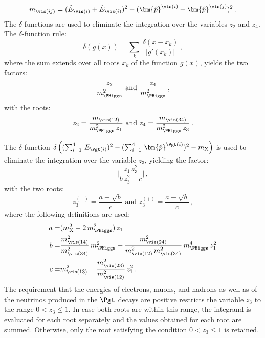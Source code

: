 \begin{equation*}
m_{\vis(ij)} = (\hat{E}_{\vis(i)} + \hat{E}_{\vis(i)})^{2} - (\bm{\hat{p}}^{\vis(i)} + \bm{\hat{p}}^{\vis(j)})^{2} \, .
\end{equation*}
The $\delta$-functions are used to eliminate the integration over the variables $z_{2}$ and $z_{4}$.
The $\delta$-function rule:
\begin{equation*} 
\delta \left( g(x) \right) = \sum_{k} \, \frac{\delta \left( x - x_{k}
  \right)}{\vert g'(x_{k}) \vert} \, ,
\end{equation*}
where the sum extends over all roots $x_{k}$ of the function $g(x)$,
yields the two factors:
\begin{equation*}
\frac{z_{2}}{m_{\PHiggs}^{2}} \mbox{ and } \frac{z_{4}}{m_{\PHiggs}^{2}} \, ,
\end{equation*}
with the roots:
\begin{equation*}
z_{2} = \frac{m_{\vis(12)}}{m_{\PHiggs}^{2} \, z_{1}} \mbox{ and } z_{4} = \frac{m_{\vis(34)}}{m_{\PHiggs}^{2} \, z_{3}} \, .
\end{equation*}

The $\delta$-function 
$\delta\left( (\sum_{i=1}^{4} \, E_{\Pgt(i)})^{2} - (\sum_{i=1}^{4} \, \bm{\hat{p}}^{\Pgt(i)})^{2} - m_{\textrm{X}} \right)$
is used to eliminate the integration over the variable $z_{3}$,
yielding the factor:
\begin{equation}
\lvert \frac{z_{1} \, z_{3}^{2}}{b \, z_{3}^{2} - c} \rvert \, ,
\label{eq:deltaFuncFactor}
\end{equation}
with the two roots:
\begin{equation*}
z_{3}^{(+)} = \frac{a + \sqrt{b}}{c} \mbox{ and } z_{3}^{(+)} = \frac{a - \sqrt{b}}{c} \, ,
\end{equation*}
where the following definitions are used:
\begin{align}
a = & (m_{\textrm{X}}^{2} - 2 \, m_{\PHiggs}^{2}) \, z_{1} \nonumber \\
b = & \frac{m_{\vis(14)}^{2}}{m_{\vis(34)}^{2}} \, m_{\PHiggs}^{2} + \frac{m_{\vis(24)}^{2}}{m_{\vis(12)}^{2} \, m_{\vis(34)}^{2}} \, m_{\PHiggs}^{4} \, z_{1}^{2} \nonumber \\
c = & m_{\vis(13)}^{2} + \frac{m_{\vis(23)}^{2}}{m_{\vis(12)}^{2}} \, z_{1}^{2} \, .
\end{align}
The requirement that the energies of electrons, muons, and hadrons as well as of the neutrinos produced in the $\Pgt$ decays are positive
restricts the variable $z_{3}$ to the range $0 < z_{3} \leq 1$.
In case both roots are within this range,
the integrand is evaluated for each root separately and the values obtained for each root are summed.
Otherwise, only the root satisfying the condition $0 < z_{3} \leq 1$ is retained.

